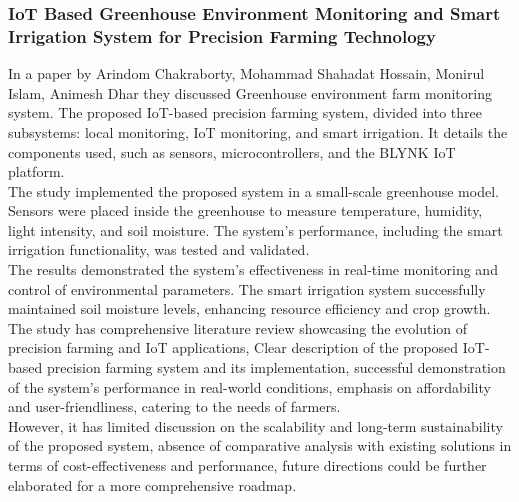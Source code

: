 \documentclass[12pt, a4paper]{article}
\begin{document}
\subsubsection{IoT Based Greenhouse Environment Monitoring and Smart Irrigation System for Precision Farming Technology}
In a paper by Arindom Chakraborty, Mohammad Shahadat Hossain, Monirul Islam, Animesh Dhar they discussed Greenhouse environment farm monitoring system.
The proposed IoT-based precision farming system, divided into three subsystems: local monitoring, IoT monitoring, and smart irrigation. It details the components used, such as sensors, microcontrollers, and the BLYNK IoT platform.\\
The study implemented the proposed system in a small-scale greenhouse model. Sensors were placed inside the greenhouse to measure temperature, humidity, light intensity, and soil moisture. The system's performance, including the smart irrigation functionality, was tested and validated.\\
The results demonstrated the system's effectiveness in real-time monitoring and control of environmental parameters. The smart irrigation system successfully maintained soil moisture levels, enhancing resource efficiency and crop growth.\\
The study has comprehensive literature review showcasing the evolution of precision farming and IoT applications, Clear description of the proposed IoT-based precision farming system and its implementation, successful demonstration of the system's performance in real-world conditions, emphasis on affordability and user-friendliness, catering to the needs of farmers.\\
However, it has limited discussion on the scalability and long-term sustainability of the proposed system,
absence of comparative analysis with existing solutions in terms of cost-effectiveness and performance, future directions could be further elaborated for a more comprehensive roadmap.
\end{document}
